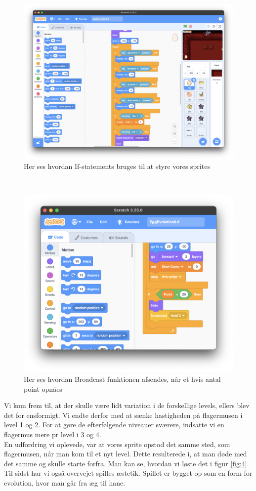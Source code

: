 \documentclass[12pt,a4paper]{article}
\begin{document}
\begin{figure}[h]
    \centering
    \includegraphics[width=\linewidth]{If-statements.png}
    \caption{Her ses hvordan If-statements bruges til at styre vores sprites}
    \label{fig:2}
\end{figure}\\
\begin{figure}[h]
    \centering
    \includegraphics[width=\linewidth]{Broadcast.png}
    \caption{Her ses hvordan Broadcast funktionen afsendes, når et hvis antal point opnåes}
    \label{fig:3}
\end{figure}
\noindent
Vi kom frem til, at der skulle være lidt variation i de forskellige levels, ellers blev det for ensformigt. Vi endte derfor med at sænke hastigheden på flagermusen i level 1 og 2. For at gøre de efterfølgende niveauer sværere, indsatte vi en flagermus mere pr level i 3 og 4. \\
En udfordring vi oplevede, var at vores sprite opstod det samme sted, som flagermusen, når man kom til et nyt level. Dette resulterede i, at man døde med det samme og skulle starte forfra.  
Man kan se, hvordan vi løste det i figur \ref{fig:4}. Til sidst har vi også overvejet spilles æstetik. Spillet er bygget op som en form for evolution, hvor man går fra æg til hane.
\end{document}
